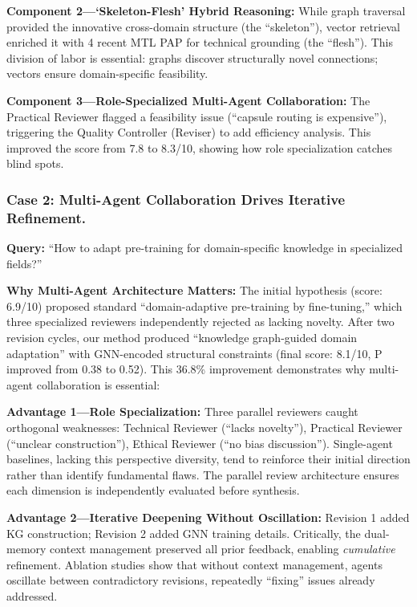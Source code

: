 \documentclass[runningheads]{llncs}
\begin{document}
\textbf{Component 2---`Skeleton-Flesh' Hybrid Reasoning:} While graph traversal provided the innovative cross-domain structure (the ``skeleton''), vector retrieval enriched it with 4 recent MTL PAP for technical grounding (the ``flesh''). This division of labor is essential: graphs discover structurally novel connections; vectors ensure domain-specific feasibility.

\textbf{Component 3---Role-Specialized Multi-Agent Collaboration:} The Practical Reviewer flagged a feasibility issue (``capsule routing is expensive''), triggering the Quality Controller (Reviser) to add efficiency analysis. This improved the score from 7.8 to 8.3/10, showing how role specialization catches blind spots.

\subsubsection{Case 2: Multi-Agent Collaboration Drives Iterative Refinement.}
\label{sec:case2}

\textbf{Query:} ``How to adapt pre-training for domain-specific knowledge in specialized fields?''

\textbf{Why Multi-Agent Architecture Matters:} The initial hypothesis (score: 6.9/10) proposed standard ``domain-adaptive pre-training by fine-tuning,'' which three specialized reviewers independently rejected as lacking novelty. After two revision cycles, our method produced ``knowledge graph-guided domain adaptation'' with GNN-encoded structural constraints (final score: 8.1/10, P improved from 0.38 to 0.52). This 36.8\% improvement demonstrates why multi-agent collaboration is essential:

\textbf{Advantage 1---Role Specialization:} Three parallel reviewers caught orthogonal weaknesses: Technical Reviewer (``lacks novelty''), Practical Reviewer (``unclear construction''), Ethical Reviewer (``no bias discussion''). Single-agent baselines, lacking this perspective diversity, tend to reinforce their initial direction rather than identify fundamental flaws. The parallel review architecture ensures each dimension is independently evaluated before synthesis.

\textbf{Advantage 2---Iterative Deepening Without Oscillation:} Revision 1 added KG construction; Revision 2 added GNN training details. Critically, the dual-memory context management preserved all prior feedback, enabling \emph{cumulative} refinement. Ablation studies show that without context management, agents oscillate between contradictory revisions, repeatedly ``fixing'' issues already addressed.
\end{document}
